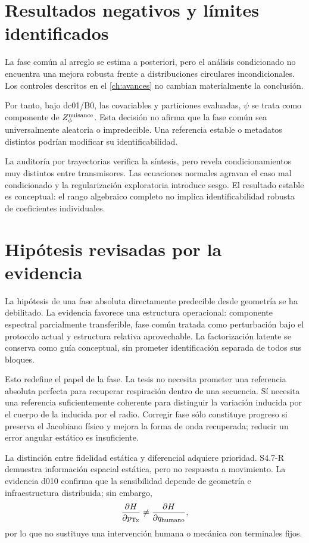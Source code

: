\section{Resultados negativos y límites identificados}

La fase común al arreglo se estima a posteriori, pero el análisis condicionado no
encuentra una mejora robusta frente a distribuciones circulares incondicionales.
Los controles descritos en el \cref{ch:avances} no cambian materialmente la
conclusión.

Por tanto, bajo dc01/B0, las covariables y particiones evaluadas, $\psi$ se trata como componente de $Z_\phi^{\rm nuisance}$. Esta decisión no afirma que la fase común sea universalmente aleatoria o impredecible. Una referencia estable o metadatos distintos podrían modificar su identificabilidad.

La auditoría por trayectorias verifica la síntesis, pero revela condicionamientos muy
distintos entre transmisores. Las ecuaciones normales agravan el caso mal condicionado
y la regularización exploratoria introduce sesgo. El resultado estable es conceptual:
el rango algebraico completo no implica identificabilidad robusta de coeficientes
individuales.

\section{Hipótesis revisadas por la evidencia}

La hipótesis de una fase absoluta directamente predecible desde geometría se ha debilitado. La evidencia favorece una estructura operacional: componente espectral parcialmente transferible, fase común tratada como perturbación bajo el protocolo actual y estructura relativa aprovechable. La factorización latente se conserva como guía conceptual, sin prometer identificación separada de todos sus bloques.

Esto redefine el papel de la fase. La tesis no necesita prometer una referencia
absoluta perfecta para recuperar respiración dentro de una secuencia. Sí necesita
una referencia suficientemente coherente para distinguir la variación inducida por
el cuerpo de la inducida por el radio. Corregir fase sólo constituye progreso si
preserva el Jacobiano físico y mejora la forma de onda recuperada; reducir un error
angular estático es insuficiente.

La distinción entre fidelidad estática y diferencial adquiere prioridad. S4.7-R demuestra información espacial estática, pero no respuesta a movimiento. La evidencia d010 confirma que la sensibilidad depende de geometría e infraestructura distribuida; sin embargo,
\begin{equation}
\frac{\partial H}{\partial p_{\rm Tx}}
\ne
\frac{\partial H}{\partial q_{\rm humano}},
\end{equation}
por lo que no sustituye una intervención humana o mecánica con terminales fijos.


